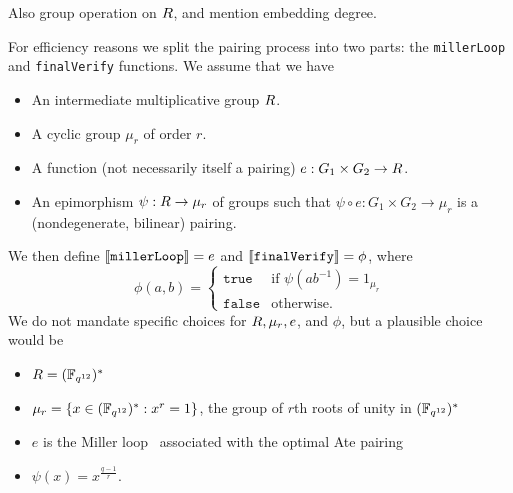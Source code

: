 \label{note:pairing}
Also group operation on $R$, and mention embedding degree.

For efficiency reasons we split the pairing process into two parts:
the \texttt{millerLoop} and \texttt{finalVerify} functions.  We assume that we
have
\begin{itemize}
\item An intermediate multiplicative group $R$.
\item A cyclic group $\mu_r$ of order $r$.
\item A function (not necessarily itself a pairing) $e: G_1 \times
G_2 \rightarrow R$.
\item An epimorphism $\psi: R \rightarrow \mu_r$ of groups such
that $\psi \circ e: G_1 \times G_2 \rightarrow \mu_r$ is a (nondegenerate,
bilinear) pairing.
\end{itemize}

\noindent We then define $\llbracket\mathit{\mathtt{millerLoop}}\rrbracket = e$ and
$\llbracket\mathit{\mathtt{finalVerify}}\rrbracket = \phi$, where
$$
\phi(a,b) = \begin{cases}
               \mathtt{true} & \text{if $\psi(ab^{-1}) = 1_{\mu_r}$} \\
               \mathtt{false} & \text{otherwise.}
            \end{cases}
$$
We do not mandate specific choices for $R, \mu_r, e$, and $\phi$, but a
plausible choice would be
\begin{itemize}
\item $R = (\mathbb{F}_{q^{12}})^*$
\item $\mu_r = \{x \in (\mathbb{F}_{q^{12}})^*: x^r=1\}$, the group of $r$th roots of unity in $(\mathbb{F}_{q^{12}})^*$
\item $e$ is the Miller loop~\cite{Miller} associated with the optimal Ate pairing~\cite{Ate}
\item $\psi(x) = x^{\frac{q-1}{r}}$.
\end{itemize}

